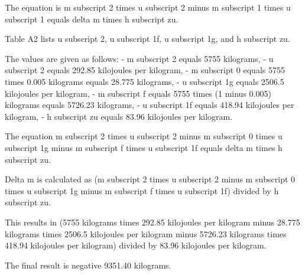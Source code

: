 The equation is m subscript 2 times u subscript 2 minus m subscript 1 times u subscript 1 equals delta m times h subscript zu.

Table A2 lists u subscript 2, u subscript 1f, u subscript 1g, and h subscript zu.

The values are given as follows:
- m subscript 2 equals 5755 kilograms,
- u subscript 2 equals 292.85 kilojoules per kilogram,
- m subscript 0 equals 5755 times 0.005 kilograms equals 28.775 kilograms,
- u subscript 1g equals 2506.5 kilojoules per kilogram,
- m subscript f equals 5755 times (1 minus 0.005) kilograms equals 5726.23 kilograms,
- u subscript 1f equals 418.94 kilojoules per kilogram,
- h subscript zu equals 83.96 kilojoules per kilogram.

The equation m subscript 2 times u subscript 2 minus m subscript 0 times u subscript 1g minus m subscript f times u subscript 1f equals delta m times h subscript zu.

Delta m is calculated as (m subscript 2 times u subscript 2 minus m subscript 0 times u subscript 1g minus m subscript f times u subscript 1f) divided by h subscript zu.

This results in (5755 kilograms times 292.85 kilojoules per kilogram minus 28.775 kilograms times 2506.5 kilojoules per kilogram minus 5726.23 kilograms times 418.94 kilojoules per kilogram) divided by 83.96 kilojoules per kilogram.

The final result is negative 9351.40 kilograms.